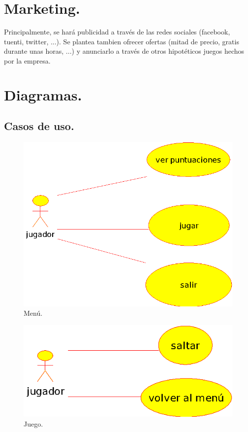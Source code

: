 \documentclass[12 pt, a4paper, twoside]{article}
\begin{document}
\section{Marketing.}

Principalmente, se hará publicidad a través de las redes sociales (facebook,
tuenti, twitter, ...). Se plantea tambien ofrecer ofertas (mitad de precio,
gratis durante unas horas, ...) y anunciarlo a través de otros hipotéticos
juegos hechos por la empresa.

\clearpage

\section{Diagramas.}

\subsection{Casos de uso.}

\begin{figure}[h]
\centering
\includegraphics[width = 10 cm]{casos_de_uso_(menu).eps}
\caption{Menú.}
\end{figure}

\begin{figure}[h]
\centering
\includegraphics[width = 10 cm]{casos_de_uso_(juego).eps}
\caption{Juego.}
\end{figure}
\end{document}
